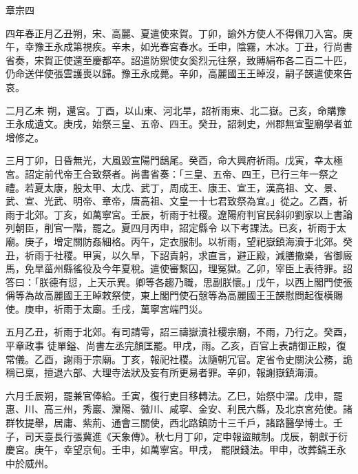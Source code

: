 
\begin{pinyinscope}

 章宗四



 四年春正月乙丑朔，宋、高麗、夏遣使來賀。丁卯，諭外方使人不得佩刀入宮。庚午，幸豫王永成第視疾。辛未，如光春宮春水。壬申，陰霧，木冰。丁丑，行尚書省奏，宋賀正使還至慶都卒。詔遣防禦使女奚烈元往祭，致賻絹布各二百二十匹，仍命送伴使張雲護喪以歸。豫王永成薨。辛卯，高麗國王王晫沒，嗣子韺遣使來告哀。



 二月乙未
 朔，還宮。丁酉，以山東、河北旱，詔祈雨東、北二嶽。己亥，命購豫王永成遺文。庚戌，始祭三皇、五帝、四王。癸丑，詔刺史，州郡無宣聖廟學者並增修之。



 三月丁卯，日昏無光，大風毀宣陽門鴟尾。癸酉，命大興府祈雨。戊寅，幸太極宮。詔定前代帝王合致祭者。尚書省奏：「三皇、五帝、四王，已行三年一祭之禮。若夏太康，殷太甲、太戊、武丁，周成王、康王、宣王，漢高祖、文、景、武、宣、光武、明帝、章帝，唐高祖、文皇一十七君致祭為宜。」從之。乙酉，祈雨于北郊。丁亥，如萬寧宮。壬辰，祈雨于社稷。遼陽府判官民斜卯劉家以上書論列朝臣，削官一階，罷之。夏四月丙申，詔定縣令
 以下考課法。已亥，祈雨于太廟。庚子，增定關防姦細格。丙午，定衣服制。以祈雨，望祀嶽鎮海瀆于北郊。癸丑，祈雨于社稷。甲寅，以久旱，下詔責躬，求直言，避正殿，減膳撤樂，省御廄馬，免旱菑州縣徭役及今年夏稅。遣使審繫囚，理冤獄。乙卯，宰臣上表待罪。詔答曰：「朕德有愆，上天示異。卿等各趨乃職，思副朕懷。」戊午，以西上閣門使張偁等為故高麗國王王晫敕祭使，東上閣門使石愨等為高麗國王王韺慰問起復橫賜使。庚申，祈雨于太廟。壬戌，萬寧宮端門災。



 五月乙丑，祈雨于北郊。有司請雩，詔三禱嶽瀆社稷宗廟，不雨，乃行之。癸酉，平章政事
 徒單鎰、尚書左丞完顏匡罷。甲戌，雨。乙亥，百官上表請御正殿，復常儀。乙酉，謝雨于宗廟。丁亥，報祀社稷。汰隨朝冗官。定省令史關決公務，詭稱已稟，擅退六部、大理寺法狀及妄有所更易者罪。辛卯，報謝嶽鎮海瀆。



 六月壬辰朔，罷兼官俸給。壬寅，復行吏目移轉法。乙巳，始祭中溜。戊申，罷惠、川、高三州，秀巖、灤陽、徽川、咸寧、金安、利民六縣，及北京宮苑使。諸群牧提舉，居庸、紫荊、通會三關使，西北路鎮防十三千戶，諸路醫學博士。壬子，司天臺長行張冀進《天象傳》。秋七月丁卯，定申報盜賊制。戊辰，朝獻于衍慶宮。庚午，幸望京甸。壬申，如萬寧宮。甲戌，
 罷限錢法。甲申，改葬鎬王永中於威州。




\end{pinyinscope}
